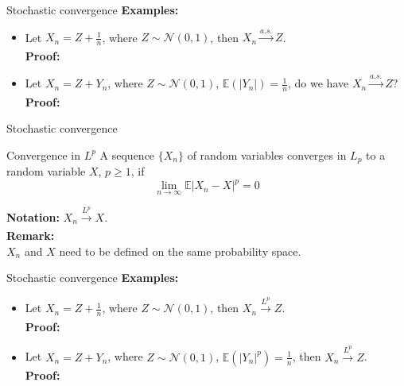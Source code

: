 \documentclass [aspectratio=169]{beamer}
\begin{document}
\begin{frame}{Stochastic convergence}
     \textbf{Examples:}\\
    \begin{itemize}
        \item Let $X_n = Z + \frac{1}{n}$, where $Z \sim \mathcal{N}(0,1)$, then $X_n \xrightarrow[]{a.s.} Z$.\\
    \vspace{0.1in}
    \textbf{Proof:}\\
    \vspace{0.7in}
    \item Let $X_n = Z + Y_n$, where $Z \sim \mathcal{N}(0,1)$, $\mathbb{E}(|Y_n|) = \frac{1}{n}$, do we have $X_n \xrightarrow[]{a.s.} Z$?\\
    \vspace{0.1in}
    \textbf{Proof:}\\
    \vspace{1in}
    \end{itemize}
\end{frame}

\begin{frame}{Stochastic convergence}
     \begin{block}{Convergence in $L^p$}
    A sequence $\{X_n\}$ of random variables converges in $L_p$ to a random variable $X$, $p \ge 1$, if 
$$
\lim_{n \to \infty} \mathbb{E}|X_n - X|^p = 0
$$
\end{block}
\vspace{0.1in}
    \textbf{Notation:}
    $X_n \xrightarrow[]{L^p} X$.\\
\vspace{0.1in}
\textbf{Remark:}\\
$X_n$ and $X$ need to be defined on the same probability space. 
\end{frame}

\begin{frame}{Stochastic convergence}
      \textbf{Examples:}\\
    \begin{itemize}
        \item Let $X_n = Z + \frac{1}{n}$, where $Z \sim \mathcal{N}(0,1)$, then $X_n \xrightarrow[]{L^p} Z$.\\
    \vspace{0.1in}
    \textbf{Proof:}\\
    \vspace{0.7in}
    \item Let $X_n = Z + Y_n$, where $Z \sim \mathcal{N}(0,1)$, $\mathbb{E}(|Y_n|^p) = \frac{1}{n}$, then $X_n \xrightarrow[]{L^p} Z$.\\
    \vspace{0.1in}
    \textbf{Proof:}\\
    \vspace{1in}
    \end{itemize}
\end{frame}
\end{document}
